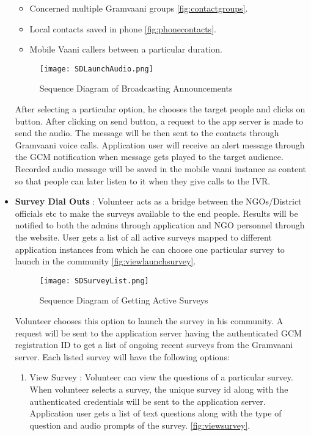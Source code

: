 \begin{itemize}
\begin{itemize}
	\item Concerned multiple Gramvaani groups \ref{fig:contactgroups}.
	\item Local contacts saved in phone \ref{fig:phonecontacts}.
	\item Mobile Vaani callers between a  particular duration.
\end{itemize}

\begin{figure}[H]
    \centering
	\texttt{[image: SDLaunchAudio.png]}
    \caption{ Sequence Diagram of Broadcasting Announcements }
    \label{fig:Sequence Diagram of Broadcasting Announcements}
\end{figure}


After selecting a particular option, he chooses the target people and clicks on button. After clicking on send button, a request to the app server is made to send the audio. The message will be then sent to the contacts through Gramvaani voice calls. Application user will receive an alert  message through the GCM notification when message gets played to the target audience.
Recorded audio message will be saved in the mobile vaani instance as content so that people can later listen to it when they give calls to the IVR.

\item \textbf{Survey Dial Outs} \label{launchsur} : Volunteer acts as a bridge between the NGOs/District officials etc to make the surveys available to the end people. Results will be notified to both the admins through application and NGO personnel through the website. User gets a list of all active surveys mapped to different application instances from which he can choose one particular survey to launch in the community \ref{fig:viewlaunchsurvey}.

\begin{figure}[H]
    \centering
	\texttt{[image: SDSurveyList.png]}
    \caption{ Sequence Diagram of Getting Active Surveys}
    \label{fig:Sequence Diagram of Getting Active Surveys}
\end{figure}


Volunteer  chooses this option to launch the survey in his community. A request will be sent to the application server having the authenticated GCM registration ID to get a list of ongoing recent surveys from the Gramvaani server. Each listed survey will have the following options:
	\begin{enumerate}
	\item{ View Survey} : Volunteer can view the questions of a particular survey. When volunteer selects a survey, the unique survey id along with the authenticated credentials will be sent to the application server. Application user gets a list of text questions along with the type of question and audio prompts of the survey.  \ref{fig:viewsurvey}.
	

\end{enumerate}
\end{itemize}
